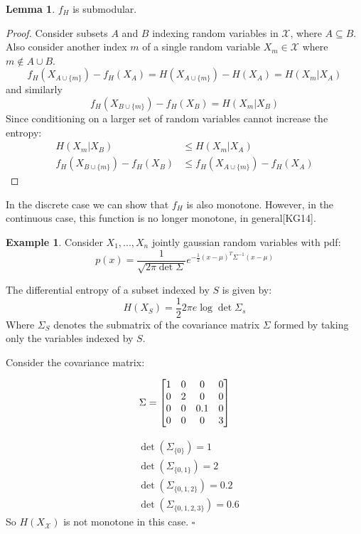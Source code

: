 \documentclass[twoside]{article}
\newcommand*{\QEDB}{\hfill\ensuremath{\square}}%
\renewcommand{\cite}[1]{[#1]}
\theoremstyle{definition}
\newtheorem{example}[theorem]{Example}
\newtheorem{lemma}[theorem]{Lemma}
\newtheorem{note}[theorem]{Note}
\begin{document}
\begin{lemma}
$f_H$ is submodular.
\end{lemma}

\begin{proof}
  Consider subsets $A$ and $B$ indexing random variables in
  $\mathcal{X}$, where $A \subseteq B$. Also consider another index
  $m$ of a single random variable $X_m \in \mathcal{X}$ where $m \notin A \cup B$.
  $$f_H(X_{A \cup \{m\}}) - f_H(X_A) = H(X_{A \cup \{m\}}) - H(X_A) = H(X_m | X_A)$$
  \centering and similarly
  $$f_H(X_{B \cup \{m\}}) - f_H(X_B) = H(X_m | X_B)$$
  Since conditioning on a larger set of random variables cannot
  increase the entropy:
  \begin{align*}
    H(X_m | X_B) & \leq H(X_m | X_A) \\
    f_H(X_{B \cup \{m\}}) - f_H(X_B) & \leq f_H(X_{A \cup \{m\}}) - f_H(X_A)
  \end{align*}
\end{proof}


In the discrete case we can show that $f_H$ is also monotone. However,
in the continuous case, this function is no longer
monotone, in general\cite{KG14}.

\begin{example}
  Consider $X_1, ..., X_n$ jointly gaussian random variables with pdf:
  $$p(x) = \frac{1}{\sqrt{2\pi \det \Sigma}} e^{-\frac{1}{2}(x-\mu)^T
    \Sigma^{-1} (x-\mu)}$$

  The differential entropy of a subset indexed by $S$ is given by:
  $$H(X_S) = \frac{1}{2} 2 \pi e\log \det \Sigma_s$$
  Where $\Sigma_S$ denotes the submatrix of the covariance matrix
  $\Sigma$ formed by taking only the variables indexed by $S$.

  Consider the covariance matrix:

  \begin{align}
    \Sigma =
    \begin{bmatrix}
               1 & 0 & 0 & 0 \\
               0 & 2 & 0 & 0 \\
               0 & 0 & 0.1 & 0 \\
               0 & 0 & 0 & 3  \notag
             \end{bmatrix}
  \end{align}

  \begin{align*}
    & \det(\Sigma_{\{0\}}) = 1\\
    & \det(\Sigma_{\{0, 1\}}) = 2\\
    & \det(\Sigma_{\{0, 1, 2\}}) = 0.2\\
    & \det(\Sigma_{\{0, 1, 2, 3\}}) = 0.6
  \end{align*}
  So $H(X_\mathcal{X})$ is not monotone in this case.
  \QEDB
\end{example}
\end{document}
